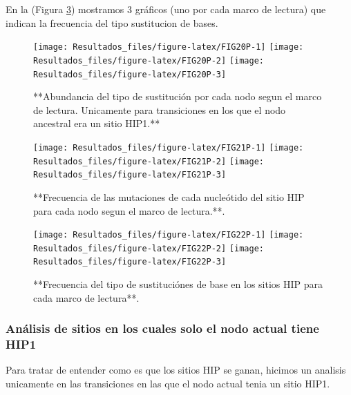 \documentclass[
]{book}
\begin{document}
En la (Figura \ref{fig:FIG22P}) mostramos 3 gráficos (uno por cada marco de lectura) que indican la frecuencia del tipo sustitucion de bases.

\begin{figure}

{\centering \texttt{[image: Resultados\_files/figure-latex/FIG20P-1]} \texttt{[image: Resultados\_files/figure-latex/FIG20P-2]} \texttt{[image: Resultados\_files/figure-latex/FIG20P-3]} 

}

\caption{**Abundancia del tipo de sustitución por cada nodo segun el marco de lectura. Unicamente para transiciones en los que el nodo ancestral era un sitio HIP1.**}\label{fig:FIG20P}
\end{figure}

\begin{figure}

{\centering \texttt{[image: Resultados\_files/figure-latex/FIG21P-1]} \texttt{[image: Resultados\_files/figure-latex/FIG21P-2]} \texttt{[image: Resultados\_files/figure-latex/FIG21P-3]} 

}

\caption{**Frecuencia de las mutaciones de cada nucleótido del sitio HIP para cada nodo segun el marco de lectura.**.}\label{fig:FIG21P}
\end{figure}

\begin{figure}

{\centering \texttt{[image: Resultados\_files/figure-latex/FIG22P-1]} \texttt{[image: Resultados\_files/figure-latex/FIG22P-2]} \texttt{[image: Resultados\_files/figure-latex/FIG22P-3]} 

}

\caption{**Frecuencia del tipo de sustituciónes de base en los sitios HIP para cada marco de lectura**.}\label{fig:FIG22P}
\end{figure}

\hypertarget{anuxe1lisis-de-sitios-en-los-cuales-solo-el-nodo-actual-tiene-hip1-3}{%
\subsubsection{Análisis de sitios en los cuales solo el nodo actual tiene HIP1}\label{anuxe1lisis-de-sitios-en-los-cuales-solo-el-nodo-actual-tiene-hip1-3}}

Para tratar de entender como es que los sitios HIP se ganan, hicimos un analisis unicamente en las transiciones en las que el nodo actual tenia un sitio HIP1.
\end{document}
